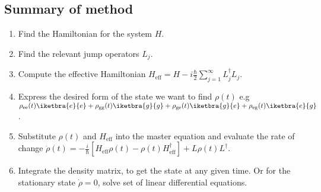\subsection{Summary of method}
\begin{framed}\noindent

  \begin{enumerate}
  \item Find the Hamiltonian for the system $H$.
  \item Find the relevant jump operators $L_j$.
  \item         Compute        the         effective        Hamiltonian
    $H_\text{eff}=H - i\frac{\hbar}{2}\sum_{j=1}^{\infty}L_j^\dagger L_j$.
  \item Express the desired form of the state we want to find $\rho(t)$
    e.g
    $\rho_\text{ee}(t)\iketbra{e}{e}  + \rho_\text{gg}(t)\iketbra{g}{g}
    +                 \rho_\text{ge}(t)\iketbra{g}{e}                 +
    \rho_\text{eg}(t)\iketbra{e}{g}$.
  \item  Substitute  $\rho(t)$  and   $H_\text{eff}$  into  the  master
    equation      and     evaluate      the     rate      of     change
    $\dot{\rho}(t)                                                       =
    -\frac{i}{\hbar}\left[H_\text{eff}\rho(t)-\rho(t)H_\text{eff}^\dagger\right]
    + L\rho(t)L^\dagger$.
  \item Integrate  the density matrix,  to get  the state at  any given
    time. {\Large Or for the stationary state $\dot{\rho}=0$, solve set of
      linear differential equations.}
  \end{enumerate}
\end{framed}

\newpage
